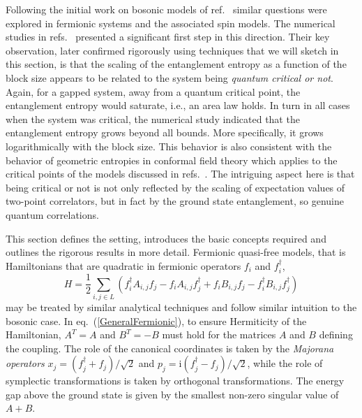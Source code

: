 \documentclass[12pt, rmp,floatfix,epsfig,graphics]{revtex4} %
\newcommand{\mi}{\mathrm{i} }
\begin{document}
Following the initial work on bosonic models of ref.\ 
\cite{Harmonic} similar questions were explored in 
fermionic systems and the associated spin models.
The numerical studies in refs.\ \cite{Latorre1,Latorre2} 
presented a significant first step in this direction. 
Their key observation, later confirmed rigorously 
\cite{Korepin,Its,Keating} using techniques that we will 
sketch in this section, is that the scaling of the 
entanglement entropy as a function of the block size 
appears to be related to the system being {\it quantum critical 
or not}. Again, for a gapped system, away from a quantum 
critical point, the entanglement entropy would saturate, 
i.e., an area law holds. In turn in all cases when the system 
was critical, the numerical study indicated that the 
entanglement entropy grows beyond all bounds. More 
specifically, it grows logarithmically with the block 
size. This behavior is also consistent with the behavior of geometric entropies 
in conformal field theory \cite{Callan,Larsen} which applies to the critical
points of the models discussed in 
refs.\ \cite{Latorre1,Latorre2,CriticalKorepin,Franchini}. 
The intriguing aspect here is that being critical 
or not is not only reflected by the scaling of expectation 
values of two-point correlators, but in fact by the ground 
state entanglement, so genuine quantum correlations.

This section defines the setting, introduces the basic 
concepts required and outlines the rigorous results in
more detail. Fermionic quasi-free models, that is Hamiltonians 
that are quadratic in fermionic operators $f_i$ and $f_i^{\dagger}$, 
\begin{equation}\label{GeneralFermionic}
        H= \frac{1}{2}\sum_{i,j\in L}
        \left(
        f_i^\dagger A_{i,j} f_j
        - 
        f_i A_{i,j} f_j^\dagger
        +f_i B_{i,j} f_j
        -f_i^\dagger B_{i,j} f_j^\dagger
        \right)
\end{equation}
may be treated by similar analytical techniques and follow similar
intuition to the bosonic case. 
In eq.\ (\ref{GeneralFermionic}), to ensure Hermiticity of the
Hamiltonian, $A^T=A$ and $B^T=-B$ must hold for the matrices $A$ 
and $B$ defining the coupling. The role of the canonical coordinates
is taken by the {\it Majorana operators} $x_j = (f_j^\dagger+ f_j)/
\sqrt{2}$ and $p_j = \mi (f_j^\dagger - f_j)/\sqrt{2}$,
while the role of symplectic transformations is taken by 
orthogonal transformations. The energy gap above the ground state is given by
the smallest non-zero singular value of $A+B$. 
\end{document}
